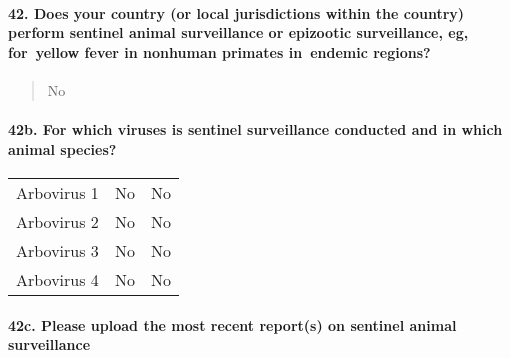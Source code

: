 \documentclass[
]{article}
\begin{document}
\begin{quote}
\end{quote}

\hypertarget{does-your-country-or-local-jurisdictions-within-the-country-perform-sentinel-animal-surveillance-or-epizootic-surveillance-eg-for-yellow-fever-in-nonhuman-primates-in-endemic-regions}{%
\paragraph{42. Does your country (or local jurisdictions within the
country) perform sentinel animal surveillance or epizootic surveillance,
eg, for~yellow fever in nonhuman primates in~endemic
regions?}\label{does-your-country-or-local-jurisdictions-within-the-country-perform-sentinel-animal-surveillance-or-epizootic-surveillance-eg-for-yellow-fever-in-nonhuman-primates-in-endemic-regions}}

\begin{quote}
No
\end{quote}

\hypertarget{b.-for-which-viruses-is-sentinel-surveillance-conducted-and-in-which-animal-species}{%
\paragraph{42b. For which viruses is sentinel surveillance conducted and
in which animal
species?}\label{b.-for-which-viruses-is-sentinel-surveillance-conducted-and-in-which-animal-species}}

\begin{longtable}[]{@{}lll@{}}
\toprule
\endhead
Arbovirus 1 & No & No \\
Arbovirus 2 & No & No \\
Arbovirus 3 & No & No \\
Arbovirus 4 & No & No \\
\bottomrule
\end{longtable}

\hypertarget{c.-please-upload-the-most-recent-reports-on-sentinel-animal-surveillance}{%
\paragraph{42c. Please upload the most recent report(s) on sentinel
animal
surveillance}\label{c.-please-upload-the-most-recent-reports-on-sentinel-animal-surveillance}}

\begin{quote}
\end{quote}
\end{document}
